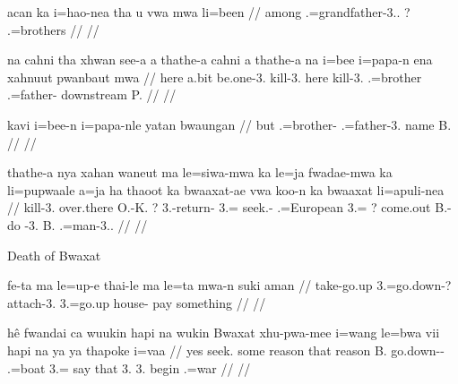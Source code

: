 \documentclass{article}
\begin{document}
\a
\begingl
\gla acan ka i=hao-nea tha u vwa mwa li=been
// \glb among  .=grandfather-3..  ?   .=brothers
// \glft {}
// \endgl

\a
\begingl
\gla na cahni tha xhwan see-a a thathe-a cahni a thathe-a na i=bee i=papa-n ena xahnuut pwanbaut mwa
// \glb {} here  a.bit be.one-3.  kill-3. here  kill-3.  .=brother .=father-  downstream P. 
// \glft {}
// \endgl

\a
\begingl
\gla kavi i=bee-n i=papa-nle yatan bwaungan
// \glb but .=brother- .=father-3. name B.
// \glft {}
// \endgl


\a
\begingl
\gla thathe-a nya xahan waneut ma le=siwa-mwa ka le=ja fwadae-mwa ka li=pupwaale a=ja ha thaoot ka bwaaxat-ae vwa koo-n ka bwaaxat li=apuli-nea
// \glb kill-3.  over.there O.-K. ? 3.-return-  3.= seek.-  .=European 3.= ? come.out  B.- do -3.  B. .=man-3..
// \glft {}
// \endgl

\xe


Death of Bwaxat

\pex
\a
\begingl
\gla fe-ta ma le=up-e thai-le ma le=ta mwa-n suki aman
// \glb take-go.up  3.=go.down-? attach-3.  3.=go.up house- pay something
// \glft {}
// \endgl

\a
\begingl
\gla hê fwandai ca wuukin hapi na wukin Bwaxat xhu-pwa-mee i=wang le=bwa vii hapi na ya ya thapoke i=vaa
// \glb yes seek. some reason that  reason B. go.down-- .=boat 3.= say that  3. 3. begin .=war
// \glft {}
// \endgl
\end{document}
